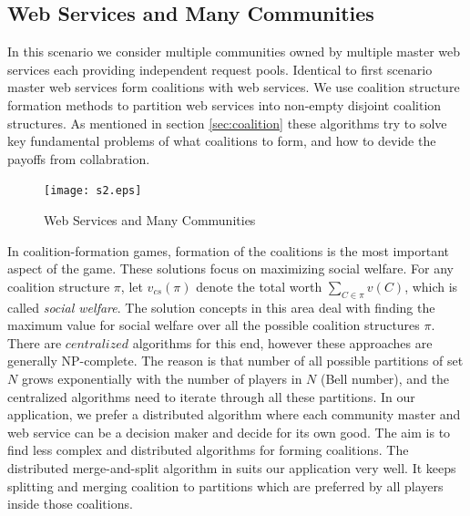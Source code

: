 \documentclass[10pt, conference, compsocconf]{IEEEtran}
\theoremstyle{plain}
\theoremstyle{definition}
\begin{document}
\subsection {Web Services and Many Communities}

In this scenario we consider multiple communities owned by multiple master web services each providing independent request pools. Identical to first scenario master web services form coalitions with web services. We use coalition structure formation methods to partition web services into non-empty disjoint coalition structures. As mentioned in section \ref{sec:coalition} these algorithms \cite{Sandholm1999209, DBLP:conf/ijcai/GrecoMPS11, DBLP:conf/ijcai/RahwanMJ11} try to solve key fundamental problems of what coalitions to form, and how to devide the payoffs from collabration. 

\begin{figure}[!t]
\centering
\texttt{[image: s2.eps]}
\caption{Web Services and Many Communities}
\label{fig_sim}
\end{figure}

In coalition-formation games, formation of the coalitions is the most important aspect of the game. These solutions focus on maximizing social welfare. For any coalition structure $\pi$, let $v_{cs}(\pi)$ denote the total worth $\sum_{C \in \pi}{v(C)}$, which is called \emph{social welfare}. The solution concepts in this area deal with finding the maximum value for social welfare over all the possible coalition structures $\pi$. There are $centralized$ algorithms for this end, however these approaches are generally NP-complete. The reason is that number of all possible partitions of set $N$ grows exponentially with the number of players in $N$ (Bell number), and the centralized algorithms need to iterate through all these partitions. 
In our application, we prefer a distributed algorithm where each community master and web service can be a decision maker and decide for its own good. The aim is to find less complex and distributed algorithms for forming coalitions\cite{DBLP:journals/igtr/AptW09,Dieckmann02dynamiccoalition,ray2007game}. The distributed merge-and-split algorithm in \cite{DBLP:journals/igtr/AptW09} suits our application very well. It keeps splitting and merging coalition to partitions which are preferred by all players inside those coalitions. 
\end{document}
